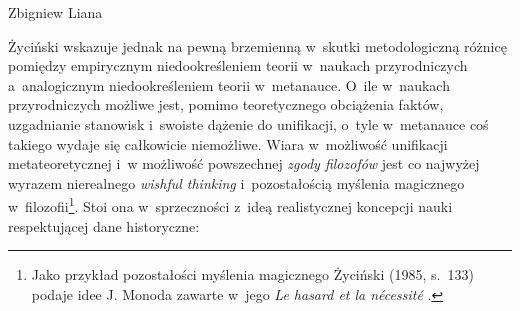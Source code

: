 \begin{artplenv}{Zbigniew Liana}


Życiński wskazuje jednak
\parencite[][s.~133.161-164]{zycinski_teizm_1985} %
 na pewną brzemienną w~skutki metodologiczną różnicę pomiędzy empirycznym niedookreśleniem teorii w~naukach przyrodniczych a~analogicznym niedookreśleniem teorii w~metanauce. O~ile w~naukach przyrodniczych możliwe jest, pomimo teoretycznego obciążenia faktów, uzgadnianie stanowisk i~swoiste dążenie do unifikacji, o~tyle w~metanauce coś takiego wydaje się całkowicie niemożliwe. Wiara w~możliwość unifikacji metateoretycznej i~w możliwość powszechnej \textit{zgody filozofów} jest co najwyżej wyrazem nierealnego \textit{wishful thinking} i~pozostałością myślenia magicznego w~filozofii\footnote{Jako przykład pozostałości myślenia magicznego Życiński (1985, s.~133) podaje idee J. Monoda zawarte w~jego \textit{Le hasard et la nécessité} \parencite*{monod_hasard_1970}.}. Stoi ona w~sprzeczności z~ideą realistycznej koncepcji nauki respektującej dane historyczne:




\end{artplenv}
